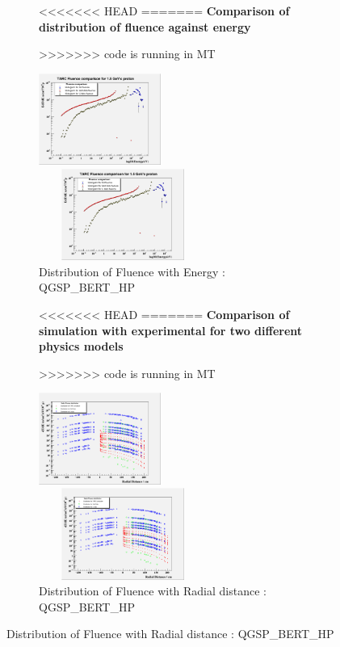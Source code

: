 \documentclass[twocolumn,amsmath,amssymb]{snp}
\begin{document}
\begin{figure}
\begin{figure}
    \centering 
<<<<<<< HEAD
=======
    \textbf{Comparison of distribution of fluence against energy}\par\medskip
>>>>>>>  code is running in MT
    \begin{minipage}[b]{0.4\textwidth}
        \includegraphics [height=30mm, width=55 mm] {FluenceEnergyBIC.png}
        \caption{\small Distribution of Fluence with Energy : QGSP\_BIC\_HP}
    \end{minipage}
    \begin{minipage}[b]{0.4\textwidth}
        \includegraphics [height=30mm, width=55mm] {FluenceEnergyBERT.png}
        \caption{\small Distribution of Fluence with Energy : QGSP\_BERT\_HP}
    \end{minipage}
\end{figure}

\begin{figure}
    \centering 
<<<<<<< HEAD
=======
    \textbf{Comparison of simulation with experimental for two different physics models}\par\medskip
>>>>>>>  code is running in MT
    \begin{minipage}[b]{0.4\textwidth}
        \includegraphics [height=30mm, width=55 mm] {FluenceRadialDistBIC.png}
        \caption{\small Distribution of Fluence with Radial distance : QGSP\_BIC\_HP}
    \end{minipage}
    \begin{minipage}[b]{0.4\textwidth}
        \includegraphics [height=30mm, width=55mm] {FluenceRadialDistBERT.png}
        \caption{\small Distribution of Fluence with Radial distance : QGSP\_BERT\_HP}
    \end{minipage}
\end{figure}


\end{figure}
\end{document}
